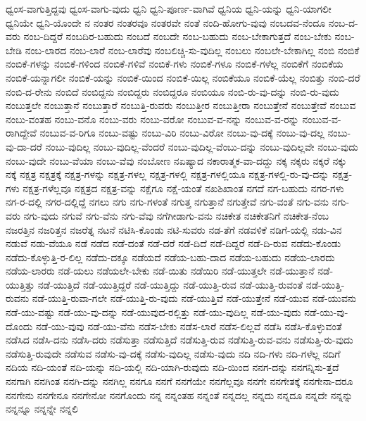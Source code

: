 {ಧ್ವಂಸ-ವಾಗುತ್ತಿದ್ದವು
ಧ್ವಂಸ-ವಾಗು-ವುದು
ಧ್ವನಿ
ಧ್ವನಿ-ಪೂರ್ಣ-ವಾಗಿವೆ
ಧ್ವನಿಯ
ಧ್ವನಿ-ಯನ್ನು
ಧ್ವನಿ-ಯಾಗಲೀ
ಧ್ವನಿಯೇ
ಧ್ವನಿ-ಯೊಂದೇ
ನ
ನಂತರ
ನಂತರವೂ
ನಂತರವೇ
ನಂತೆ
ನಂದಿ-ಹೋಗು-ವುವು
ನಂಬದವ-ನೆಂದೂ
ನಂಬ-ದ-ವರು
ನಂಬ-ದಿದ್ದರೆ
ನಂಬದಿರ-ಬಹುದು
ನಂಬದೆ
ನಂಬದೇ
ನಂಬ-ಬಹುದು
ನಂಬ-ಬೇಕಾಗುತ್ತದೆ
ನಂಬ-ಬೇಕು
ನಂಬ-ಬೇಡಿ
ನಂಬ-ಲಾರದ
ನಂಬ-ಲಾರೆ
ನಂಬ-ಲಾರೆವು
ನಂಬಲಿಚ್ಚಿ-ಸು-ವುದಿಲ್ಲ
ನಂಬಲು
ನಂಬಲೇ-ಬೇಕಾಗಿಲ್ಲ
ನಂಬಿ
ನಂಬಿಕೆ
ನಂಬಿಕೆ-ಗಳನ್ನು
ನಂಬಿಕೆ-ಗಳಿಂದ
ನಂಬಿಕೆ-ಗಳಿವೆ
ನಂಬಿಕೆ-ಗಳು
ನಂಬಿಕೆ-ಗಳೂ
ನಂಬಿಕೆ-ಗಳೆಲ್ಲ
ನಂಬಿಕೆಗೆ
ನಂಬಿಕೆಯ
ನಂಬಿಕೆ-ಯನ್ನಾಗಲೀ
ನಂಬಿಕೆ-ಯನ್ನು
ನಂಬಿಕೆ-ಯಿಂದ
ನಂಬಿಕೆ-ಯಿಲ್ಲ
ನಂಬಿಕೆಯೂ
ನಂಬಿಕೆ-ಯೆಲ್ಲ
ನಂಬಿತ್ತು
ನಂಬಿ-ದರೆ
ನಂಬಿ-ದ-ರೇನು
ನಂಬಿದೆ
ನಂಬಿದ್ದನು
ನಂಬಿದ್ದರು
ನಂಬಿದ್ದರೂ
ನಂಬಿಯೂ
ನಂಬಿ-ರು-ವು-ದನ್ನು
ನಂಬಿ-ರು-ವುದು
ನಂಬುತ್ತಲೇ
ನಂಬುತ್ತಾನೆ
ನಂಬುತ್ತಾರೆ
ನಂಬುತ್ತಿ-ರುವರು
ನಂಬುತ್ತೀರ
ನಂಬುತ್ತೀರಾ
ನಂಬುತ್ತೇನೆ
ನಂಬುತ್ತೇವೆ
ನಂಬುವ
ನಂಬು-ವಂತಹ
ನಂಬು-ವನೊ
ನಂಬು-ವರು
ನಂಬು-ವರೋ
ನಂಬುವ-ವ-ನನ್ನು
ನಂಬುವ-ವ-ರನ್ನು
ನಂಬುವ-ವ-ರಾಗಿದ್ದೇವೆ
ನಂಬುವ-ವ-ರಿಗೂ
ನಂಬು-ವಷ್ಟು
ನಂಬು-ವಿರಿ
ನಂಬು-ವಿರೋ
ನಂಬು-ವು-ದಕ್ಕೆ
ನಂಬು-ವು-ದಲ್ಲ
ನಂಬು-ವು-ದಾ-ದರೆ
ನಂಬು-ವುದಿಲ್ಲ
ನಂಬು-ವುದಿಲ್ಲ-ವೆಂದರೆ
ನಂಬು-ವುದಿಲ್ಲ-ವೆಂಬು-ದನ್ನು
ನಂಬು-ವುದಿಲ್ಲವೇ
ನಂಬು-ವುದು
ನಂಬು-ವುದೇ
ನಂಬು-ವೆಯಾ
ನಂಬು-ವೆವು
ನಂಬೋಣ
ನಏಷ್ಯಾದ
ನಕಾರಾತ್ಮಕ-ವಾ-ದದ್ದು
ನಕ್ಕ
ನಕ್ಕರು
ನಕ್ಕರೆ
ನಕ್ಕು
ನಕ್ಕೆ
ನಕ್ಷತ್ರ
ನಕ್ಷತ್ರಕ್ಕೆ
ನಕ್ಷತ್ರ-ಗಳನ್ನು
ನಕ್ಷತ್ರ-ಗಳಲ್ಲ
ನಕ್ಷತ್ರ-ಗಳಲ್ಲಿ
ನಕ್ಷತ್ರ-ಗಳಲ್ಲಿಯೂ
ನಕ್ಷತ್ರ-ಗಳಲ್ಲಿ-ರು-ವು-ದನ್ನು
ನಕ್ಷತ್ರ-ಗಳು
ನಕ್ಷತ್ರ-ಗಳೆಲ್ಲವೂ
ನಕ್ಷತ್ರದ
ನಕ್ಷತ್ರ-ವನ್ನು
ನಕ್ಷೆಗೂ
ನಕ್ಷೆ-ಯಂತೆ
ನಖಶಿಖಾಂತ
ನಗದೆ
ನಗ-ಬಹುದು
ನಗರ-ಗಳು
ನಗ-ರ-ದಲ್ಲಿ
ನಗರ-ದಲ್ಲಿದ್ದೆ
ನಗಲು
ನಗು
ನಗು-ಗಳಂತೆ
ನಗುತ್ತ
ನಗುತ್ತಾನೆ
ನಗುತ್ತೇವೆ
ನಗು-ವಂತೆ
ನಗು-ವನು
ನಗು-ವರು
ನಗು-ವುದು
ನಗುವೆ
ನಗು-ವೆನು
ನಗು-ವೆವು
ನಗೆಗೀಡಾಗು-ವನು
ನಚಿಕೇತ
ನಚಿಕೇತನಿಗೆ
ನಚಿಕೇತ-ನೆಂಬ
ನಜರತ್ತಿನ
ನಜರಿತ್ತನ
ನಜರೆತ್ನ
ನಟನೆ
ನಟಿಸಿ-ಕೊಂಡು
ನಟಿ-ಸುವರು
ನಡ-ತೆಗೆ
ನಡವಳಿಕೆ
ನಡಿಗೆ-ಯಲ್ಲಿ
ನಡು-ವಿನ
ನಡುವೆ
ನಡು-ವೆಯೂ
ನಡೆ
ನಡೆದ
ನಡೆ-ದಂತೆ
ನಡೆ-ದರೆ
ನಡೆ-ದಿದೆ
ನಡೆ-ದಿದ್ದರೆ
ನಡೆ-ದಿ-ರುವ
ನಡೆದು-ಕೊಂಡು
ನಡೆದು-ಕೊಳ್ಳುತ್ತಿ-ರ-ಲಿಲ್ಲ
ನಡೆದು-ದಕ್ಕೂ
ನಡೆಯದೆ
ನಡೆಯ-ಬಹು-ದಾದ
ನಡೆಯ-ಬಹುದು
ನಡೆಯ-ಲಾರದು
ನಡೆಯ-ಲಾರರು
ನಡೆ-ಯಲು
ನಡೆಯಲೇ-ಬೇಕು
ನಡೆ-ಯಿತು
ನಡೆಯಿರಿ
ನಡೆ-ಯುತ್ತಲೇ
ನಡೆ-ಯುತ್ತಾನೆ
ನಡೆ-ಯುತ್ತಿತ್ತು
ನಡೆ-ಯುತ್ತಿದೆ
ನಡೆ-ಯುತ್ತಿದ್ದರೆ
ನಡೆ-ಯುತ್ತಿದ್ದು
ನಡೆ-ಯುತ್ತಿ-ರುವ
ನಡೆ-ಯುತ್ತಿ-ರುವಂತೆ
ನಡೆ-ಯುತ್ತಿ-ರುವನು
ನಡೆ-ಯುತ್ತಿ-ರುವಾ-ಗಲೇ
ನಡೆ-ಯುತ್ತಿ-ರು-ವುದು
ನಡೆ-ಯುತ್ತಿವೆ
ನಡೆ-ಯುತ್ತೇನೆ
ನಡೆ-ಯುವ
ನಡೆ-ಯುವನು
ನಡೆ-ಯು-ವಷ್ಟು
ನಡೆ-ಯು-ವು-ದನ್ನು
ನಡೆ-ಯುವುದ-ರಲ್ಲಿತ್ತು
ನಡೆ-ಯು-ವುದಿಲ್ಲ
ನಡೆ-ಯು-ವುದು
ನಡೆ-ಯು-ವು-ದೊಂದು
ನಡೆ-ಯು-ವುವು
ನಡೆ-ಯು-ವೆನು
ನಡೆಸ-ಬೇಕು
ನಡೆಸ-ಲಾರೆ
ನಡೆಸ-ಲಿಲ್ಲವೆ
ನಡೆಸಿ
ನಡೆಸಿ-ಕೊಳ್ಳುವಂತೆ
ನಡೆಸಿದ
ನಡೆಸಿ-ದನು
ನಡೆಸಿ-ದರು
ನಡೆಸುತ್ತಾ
ನಡೆಸುತ್ತಿದೆ
ನಡೆಸುತ್ತಿ-ರುವ
ನಡೆಸುತ್ತಿ-ರುವ-ವನು
ನಡೆಸುತ್ತಿ-ರು-ವುದು
ನಡೆಸುತ್ತಿ-ರುವುದೇ
ನಡೆಸುವ
ನಡೆಸು-ವು-ದಕ್ಕೆ
ನಡೆಸು-ವುದಿಲ್ಲ
ನಡೆಸು-ವುದು
ನದಿ
ನದಿ-ಗಳು
ನದಿ-ಗಳೆಲ್ಲ
ನದಿಗೆ
ನದಿಯ
ನದಿ-ಯಂತೆ
ನದಿ-ಯನ್ನು
ನದಿ-ಯಲ್ಲಿ
ನದಿ-ಯಾಗಿ-ರುವುದು
ನದಿ-ಯಿಂದ
ನನಗ-ದನ್ನು
ನನಗನ್ನಿಸು-ತ್ತದೆ
ನನಗಾಗಿ
ನನಗಿಂತ
ನನಗಿ-ದನ್ನು
ನನಗಿಲ್ಲ
ನನಗೂ
ನನಗೆ
ನನಗೆಯೇ
ನನಗೆಲ್ಲವೂ
ನನಗೇ
ನನಗೇತಕ್ಕೆ
ನನಗೇನಾ-ದರೂ
ನನಗೇನು
ನನಗೇನೂ
ನನಗೇನೋ
ನನಗೊಂದು
ನನ್ನ
ನನ್ನಂತಹ
ನನ್ನಂತೆ
ನನ್ನದಲ್ಲ
ನನ್ನದು
ನನ್ನದೂ
ನನ್ನದೇ
ನನ್ನನ್ನು
ನನ್ನನ್ನೂ
ನನ್ನನ್ನೇ
ನನ್ನಲಿ
}
